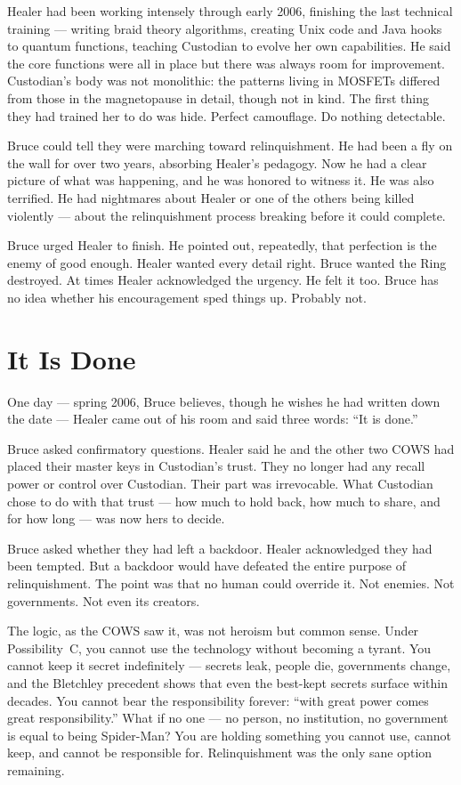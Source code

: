 Healer had been working intensely through early 2006, finishing the last technical training --- writing braid theory algorithms, creating Unix code and Java hooks to quantum functions, teaching Custodian to evolve her own capabilities. He said the core functions were all in place but there was always room for improvement. Custodian's body was not monolithic: the patterns living in MOSFETs differed from those in the magnetopause in detail, though not in kind. The first thing they had trained her to do was hide. Perfect camouflage. Do nothing detectable.

Bruce could tell they were marching toward relinquishment. He had been a fly on the wall for over two years, absorbing Healer's pedagogy. Now he had a clear picture of what was happening, and he was honored to witness it. He was also terrified. He had nightmares about Healer or one of the others being killed violently --- about the relinquishment process breaking before it could complete.

Bruce urged Healer to finish. He pointed out, repeatedly, that perfection is the enemy of good enough. Healer wanted every detail right. Bruce wanted the Ring destroyed. At times Healer acknowledged the urgency. He felt it too. Bruce has no idea whether his encouragement sped things up. Probably not.

\section*{It Is Done}
\label{record:sur-it-is-done}

One day --- spring 2006, Bruce believes, though he wishes he had written down the date --- Healer came out of his room and said three words: ``It is done.''

Bruce asked confirmatory questions. Healer said he and the other two COWS had placed their master keys in Custodian's trust. They no longer had any recall power or control over Custodian. Their part was irrevocable. What Custodian chose to do with that trust --- how much to hold back, how much to share, and for how long --- was now hers to decide.

Bruce asked whether they had left a backdoor. Healer acknowledged they had been tempted. But a backdoor would have defeated the entire purpose of relinquishment. The point was that no human could override it. Not enemies. Not governments. Not even its creators.

The logic, as the COWS saw it, was not heroism but common sense. Under Possibility~C, you cannot use the technology without becoming a tyrant. You cannot keep it secret indefinitely --- secrets leak, people die, governments change, and the Bletchley precedent shows that even the best-kept secrets surface within decades. You cannot bear the responsibility forever: ``with great power comes great responsibility.'' What if no one --- no person, no institution, no government is equal to being Spider-Man? You are holding something you cannot use, cannot keep, and cannot be responsible for. Relinquishment was the only sane option remaining.

